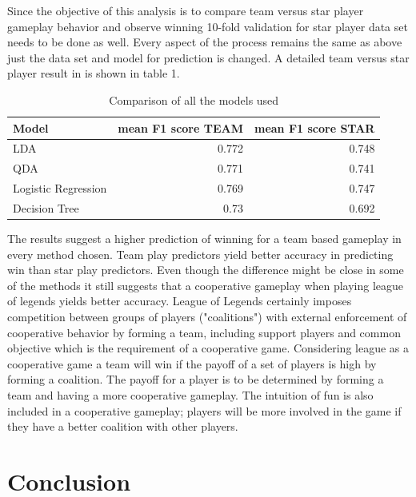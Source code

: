 \documentclass[conference]{IEEEtran}
\begin{document}
Since the objective of this analysis is to compare team versus star player gameplay behavior and observe winning 10-fold validation for star player data set needs to be done as well. Every aspect of the process remains the same as above just the data set and model for prediction is changed.
A detailed team versus star player result in is shown in table 1.

\begin{table}[htbp]
  \centering
  \caption{Comparison of all the models used}
    \begin{tabular}{|l|r|r|}
    \toprule
    Model & \multicolumn{1}{l|}{mean F1 score TEAM} & \multicolumn{1}{l|}{mean F1 score STAR} \\
    \midrule
    LDA   & 0.772 & 0.748 \\
    \midrule
    QDA   & 0.771 & 0.741 \\
    \midrule
    Logistic Regression & 0.769 & 0.747 \\
  \midrule
    Decision Tree & 0.73  & 0.692 \\
    \bottomrule
    \end{tabular}%
  \label{tab:addlabel}%
\end{table}%
 


The results suggest a higher prediction of winning for a team based gameplay in every method chosen. Team play predictors yield better accuracy in predicting win than star play predictors. Even though the difference might be close in some of the methods it still suggests that a cooperative gameplay when playing league of legends yields better accuracy. League of Legends certainly imposes competition between groups of players ("coalitions") with external enforcement of cooperative behavior by forming a team, including support players and common objective which is the requirement of a cooperative game. Considering league as a cooperative game a team will win if the payoff of a set of players is high by forming a coalition. The payoff for a player is to be determined by forming a team and having a more cooperative gameplay. The intuition of fun is also included in a cooperative gameplay; players will be more involved in the game if they have a better coalition with other players.

\section{Conclusion}
\end{document}
